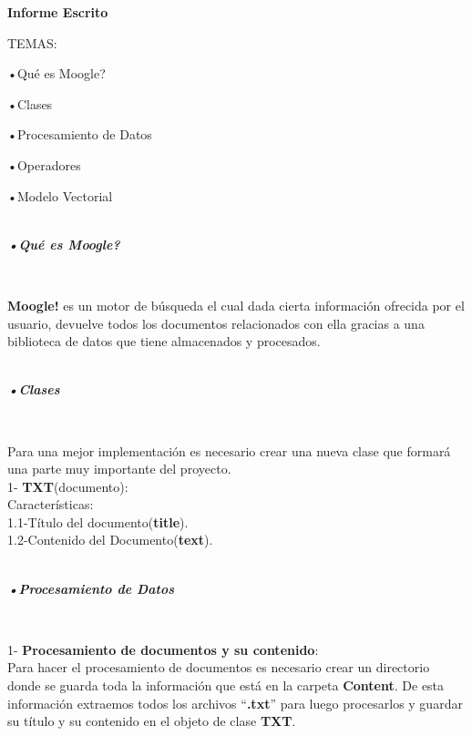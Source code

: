 \documentclass[12pt,a4paper,onecolumn]{report}
\begin{document}
\begin{flushleft}

\begin{LARGE}
\textbf{Informe Escrito}
\end{LARGE}

\begin{Large}
TEMAS:

•Qué es Moogle?

•Clases

•Procesamiento de Datos

•Operadores

•Modelo Vectorial

\end{Large}

\begin{LARGE}
\textbf{\\\emph{•Qué es Moogle?}}
\end{LARGE}\\

\begin{large}
\textbf{Moogle!} es un motor de búsqueda el cual dada cierta
información ofrecida por el usuario, devuelve todos los
documentos relacionados con ella gracias a una biblioteca de
datos que tiene almacenados y procesados.
\end{large}

\begin{LARGE}
\textbf{\\\emph{•Clases}}
\end{LARGE}\\

\begin{large}
Para una mejor implementación es necesario crear una nueva
clase que formará una parte muy importante del proyecto.
\\
1- \textbf{TXT}(documento):
\\
Características: \\
1.1-Título del documento(\textbf{title}).
                   \\
1.2-Contenido del Documento(\textbf{text}).
\end{large}

\begin{LARGE}
\textbf{\\\emph{•Procesamiento de Datos}}
\end{LARGE}\\

\begin{large}

1-\textbf{ Procesamiento de documentos y su contenido}:
\\
Para hacer el procesamiento de documentos es necesario crear
un directorio donde se guarda toda la información que está en la
carpeta \textbf{Content}.
De esta información extraemos todos los archivos “\textbf{.txt}” para
luego procesarlos y guardar su título y su contenido en el objeto
de clase \textbf{TXT}.\\



\end{large}
\end{flushleft}
\end{document}
